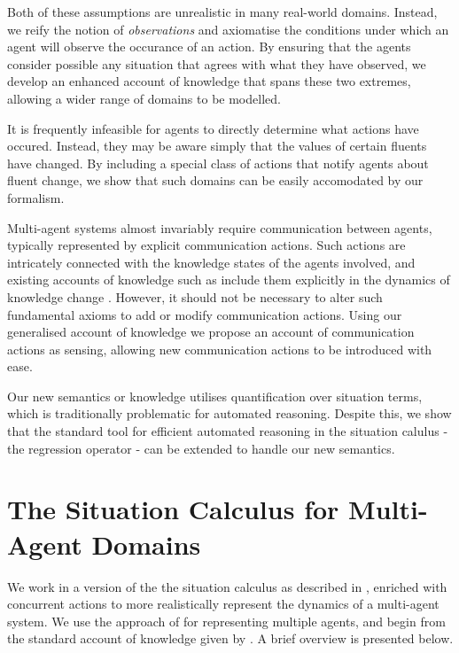 \documentclass[letterpaper]{article}
\begin{document}
Both of these assumptions are unrealistic in many real-world domains.
Instead, we reify the notion of \emph{observations} and axiomatise
the conditions under which an agent will observe the occurance of
an action. By ensuring that the agents consider possible any situation
that agrees with what they have observed, we develop an enhanced account
of knowledge that spans these two extremes, allowing a wider range
of domains to be modelled.

It is frequently infeasible for agents to directly determine
what actions have occured. Instead, they may be aware simply that
the values of certain fluents have changed. By including a special
class of actions that notify agents about fluent change, we show that
such domains can be easily accomodated by our formalism.

Multi-agent systems almost invariably require communication between
agents, typically represented by explicit communication actions. Such
actions are intricately connected with the knowledge states of the
agents involved, and existing accounts of knowledge such as 
include them explicitly in the dynamics of knowledge change \cite{shapiro01casl_feat_inter}.
However, it should not be necessary to alter such fundamental axioms to add
or modify communication actions. Using our generalised account of
knowledge we propose an account of communication actions as sensing,
allowing new communication actions to be introduced with ease.

Our new semantics or knowledge utilises quantification over situation
terms, which is traditionally problematic for automated reasoning. 
Despite this, we
show that the standard tool for efficient automated reasoning in the situation
calulus - the regression operator \cite{reiter91frameprob} - can
be extended to handle our new semantics.


\section{The Situation Calculus for Multi-Agent Domains}

We work in a version of the the situation calculus as described in
\cite{pirri99contributions_sitcalc}, enriched with concurrent actions
\cite{reiter96sc_nat_conc} to more realistically represent the dynamics
of a multi-agent system. We use the approach of \cite{shapiro01casl_feat_inter}
for representing multiple agents, and begin from the standard account
of knowledge given by \cite{scherl03sc_knowledge,scherl03conc_knowledge}.
A brief overview is presented below.
\end{document}
